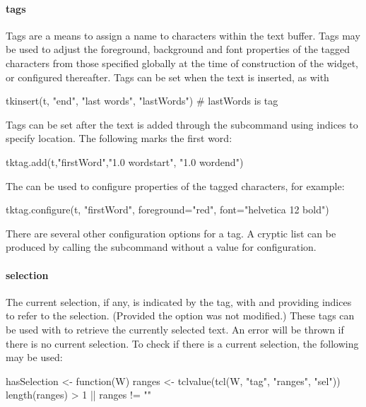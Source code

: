 \paragraph{tags}
Tags are a means to assign a name to characters within the text buffer. Tags may be used to adjust the 
foreground, background and font properties of the tagged characters from those specified globally at the time of construction of the widget, or configured thereafter. Tags can be set when the text is inserted, as with
\begin{Schunk}
\begin{Sinput}
 tkinsert(t, "end", "last words", "lastWords") # lastWords is tag
\end{Sinput}
\end{Schunk}

Tags can be set after the text is added through the
 subcommand using indices to specify
location. The following marks the first word:
\begin{Schunk}
\begin{Sinput}
 tktag.add(t,"firstWord","1.0 wordstart", "1.0 wordend")
\end{Sinput}
\end{Schunk}
The  can be used to configure properties of the tagged characters, for example:
\begin{Schunk}
\begin{Sinput}
 tktag.configure(t, "firstWord", foreground="red", font="helvetica 12 bold")
\end{Sinput}
\end{Schunk}
There are several other configuration options for a tag. A cryptic list can be produced by calling the subcommand  without a value for configuration.


\paragraph{selection}
The current selection, if any, is indicated by the  tag,
with  and  providing indices to refer
to the selection. (Provided the option  was not
modified.) These tags can be used with  to retrieve the
currently selected text. An error will be thrown if there is no
current selection. To check if there is a current selection, the following may be used:
\begin{Schunk}
\begin{Sinput}
 hasSelection <- function(W) {
   ranges <- tclvalue(tcl(W, "tag", "ranges", "sel"))
   length(ranges) > 1 || ranges != ""
 }
\end{Sinput}
\end{Schunk}

